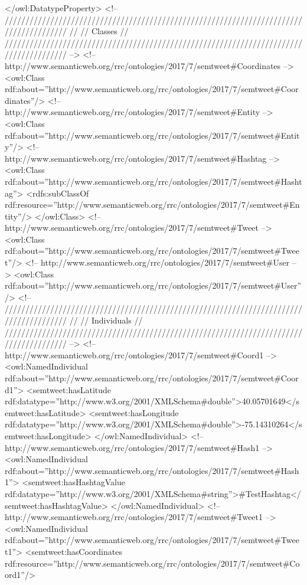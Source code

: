 \begin{listing}[
  language = XML,
  numbers=left,
  numberstyle=\tiny,
  stepnumber=5,
  numbersep=5pt,
  frame=single,
  caption  = {Ontología de tweets: Ontotwitter},
  label    = code:ontotwitter]
    </owl:DatatypeProperty>
    <!-- 
    ///////////////////////////////////////////////////////////////////////////////////////
    //
    // Classes
    //
    ///////////////////////////////////////////////////////////////////////////////////////
     -->
    <!-- http://www.semanticweb.org/rrc/ontologies/2017/7/semtweet#Coordinates
    -->
    <owl:Class
    rdf:about=''http://www.semanticweb.org/rrc/ontologies/2017/7/semtweet#Coordinates''/>
    <!-- http://www.semanticweb.org/rrc/ontologies/2017/7/semtweet#Entity -->
    <owl:Class
    rdf:about=''http://www.semanticweb.org/rrc/ontologies/2017/7/semtweet#Entity''/>
    <!-- http://www.semanticweb.org/rrc/ontologies/2017/7/semtweet#Hashtag -->
    <owl:Class
    rdf:about=''http://www.semanticweb.org/rrc/ontologies/2017/7/semtweet#Hashtag''>
        <rdfs:subClassOf
        rdf:resource=''http://www.semanticweb.org/rrc/ontologies/2017/7/semtweet#Entity''/>
    </owl:Class>
    <!-- http://www.semanticweb.org/rrc/ontologies/2017/7/semtweet#Tweet -->
    <owl:Class
    rdf:about=''http://www.semanticweb.org/rrc/ontologies/2017/7/semtweet#Tweet''/>
    <!-- http://www.semanticweb.org/rrc/ontologies/2017/7/semtweet#User -->
    <owl:Class
    rdf:about=''http://www.semanticweb.org/rrc/ontologies/2017/7/semtweet#User''/>
    <!-- 
    ///////////////////////////////////////////////////////////////////////////////////////
    //
    // Individuals
    //
    ///////////////////////////////////////////////////////////////////////////////////////
     -->
    <!-- http://www.semanticweb.org/rrc/ontologies/2017/7/semtweet#Coord1 -->
    <owl:NamedIndividual
    rdf:about=''http://www.semanticweb.org/rrc/ontologies/2017/7/semtweet#Coord1''>
        <semtweet:hasLatitude
        rdf:datatype=''http://www.w3.org/2001/XMLSchema#double''>40.05701649</semtweet:hasLatitude>
        <semtweet:hasLongitude
        rdf:datatype=''http://www.w3.org/2001/XMLSchema#double''>-75.14310264</semtweet:hasLongitude>
    </owl:NamedIndividual>
    <!-- http://www.semanticweb.org/rrc/ontologies/2017/7/semtweet#Hash1 -->
    <owl:NamedIndividual
    rdf:about=''http://www.semanticweb.org/rrc/ontologies/2017/7/semtweet#Hash1''>
        <semtweet:hasHashtagValue
        rdf:datatype=''http://www.w3.org/2001/XMLSchema#string''>#TestHashtag</semtweet:hasHashtagValue>
    </owl:NamedIndividual>
    <!-- http://www.semanticweb.org/rrc/ontologies/2017/7/semtweet#Tweet1 -->
    <owl:NamedIndividual
    rdf:about=''http://www.semanticweb.org/rrc/ontologies/2017/7/semtweet#Tweet1''>
        <semtweet:hasCoordinates
        rdf:resource=''http://www.semanticweb.org/rrc/ontologies/2017/7/semtweet#Coord1''/>

\end{listing}
